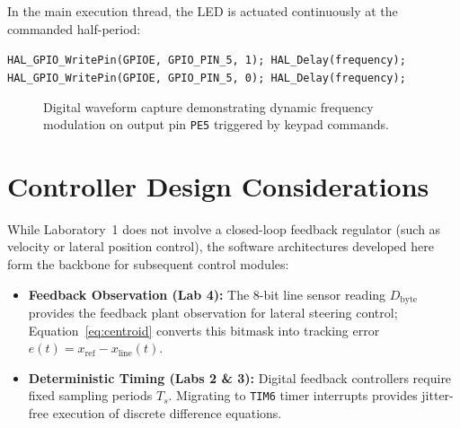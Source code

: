 In the main execution thread, the LED is actuated continuously at the commanded half-period:
\begin{center}
\small
\texttt{HAL\_GPIO\_WritePin(GPIOE, GPIO\_PIN\_5, 1); HAL\_Delay(frequency); HAL\_GPIO\_WritePin(GPIOE, GPIO\_PIN\_5, 0); HAL\_Delay(frequency);}
\end{center}

\begin{figure}[htbp]
    \centering
    \caption{Digital waveform capture demonstrating dynamic frequency modulation on output pin \texttt{PE5} triggered by keypad commands.}
    \label{fig:tim6_led_timing}
\end{figure}

\section{Controller Design Considerations}
While Laboratory~1 does not involve a closed-loop feedback regulator (such as velocity or lateral position control), the software architectures developed here form the backbone for subsequent control modules:
\begin{itemize}[noitemsep,topsep=1pt]
    \item \textbf{Feedback Observation (Lab 4):} The 8-bit line sensor reading $D_{\text{byte}}$ provides the feedback plant observation for lateral steering control; Equation~\ref{eq:centroid} converts this bitmask into tracking error $e(t) = x_{\text{ref}} - x_{\text{line}}(t)$.
    \item \textbf{Deterministic Timing (Labs 2 \& 3):} Digital feedback controllers require fixed sampling periods $T_s$. Migrating to \texttt{TIM6} timer interrupts provides jitter-free execution of discrete difference equations.
\end{itemize}

